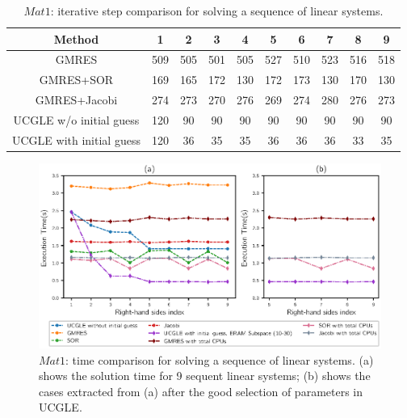 \begin{table}[htbp]
	\small
	\label{tb1}
	\caption{$Mat1$: iterative step comparison for solving a sequence of linear systems.}
	\centering
	\renewcommand{\arraystretch}{1.6}
	\begin{tabular}{c*{9}{c}}
		\toprule
		Method              & 1 &  2 &  3 &  4 &  5  &  6  & 7 & 8 & 9\\
		\hline
		GMRES & 509 & 505 & 501 & 505 & 527 & 510  &523&516& 518\\
		GMRES+SOR            & 169 & 165 & 172 & 130 & 172 & 173 &130&170&130\\
		GMRES+Jacobi            & 274 & 273 & 270 & 276 & 269 & 274 &280&276&273\\
		UCGLE w/o initial guess     & 120 & 90 & 90 & 90 & 90 &90 &90&90& 90\\
		UCGLE with initial guess     & 120 & 36 & 35 & 35 & 36 &36  &36&33&35\\
		\hline
	\end{tabular}
\end{table}

\begin{figure}
	\centering
	\includegraphics[width=6.4in]{fig/seqrhs1.eps}
	\caption{$Mat1$: time comparison for solving a sequence of linear systems. (a) shows the solution time for 9 sequent linear systems; (b) shows the cases extracted from (a) after the good selection of parameters in UCGLE.}
	\label{fig:seqrhs1}
\end{figure}

